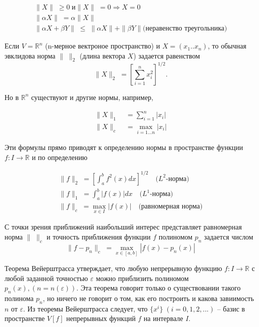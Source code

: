 \begin{equation}
\begin{array}{l}
\parallel X \parallel \; \geq 0 \; \text{и}  \parallel X \parallel \; = 0 \Rightarrow X = 0 \\
\parallel \alpha X \parallel \; = \alpha \parallel X \parallel  \\ 
\parallel \alpha X + \beta Y\parallel \; \leq \; \parallel \alpha  X \parallel + \parallel \beta Y \parallel \text{(неравенство треугольника)}
\end{array}
\end{equation}

Если $V = \mathbb{R}^n$ (n-мерное вектроное пространство) и $X = (x_1 .. x_n)$, то обычная эвклидова норма $\parallel\;\parallel_2$ (длина вектора $X$) задается равенством
\begin{equation}
\parallel X\parallel_2 \; = \left[\sum_{i=1}^{n} x_i^2 \right]^{1/2}.
\end{equation}

Но в $\mathbb{R}^n$ существуют и другие нормы, например,

\begin{align}
\parallel X \parallel_1 \; &= \sum_{i = 1}^{n}|x_i| \\
\parallel X \parallel_c \; &= \max_{i = 1...n}|x_i|
\end{align}

Эти формулы прямо приводят к определению нормы в пространстве функции $f: I \rightarrow \mathbb{R}$ и по определению

\begin{equation}
\begin{gathered}
\parallel f \parallel_2 \; = \left[ \int_{a}^{b} f^2(x)dx \right]^{1/2} \quad \text{($L^2$-норма)}\\
\parallel f \parallel_1 \; = \int_{a}^{b} |f(x)|dx \quad \text{($L^1$-норма)} \\
\parallel f \parallel_c \; = \max_{x \in I}|f(x)| \quad \text{(равномерная норма)}
\end{gathered}
\end{equation} 

С точки зрения приближений наибольший интерес представляет равномерная норма $\parallel \; \parallel_c	$ и точность приближения функции $f$ полиномом $p_n$ задается числом 
\begin{equation}
\parallel f - p_n \parallel_c \; = \max_{x\in [a, b]} |f(x)-p_n(x)|
\end{equation}


Теорема Вейерштрасса утверждает, что любую непрерывную функцию $f: I \rightarrow \mathbb{R}$  с любой заданной точностью $\varepsilon$ можно приблизить полиномом $p_n(x), (n = n(\varepsilon))$. 
Эта теорема говорит только о существовании такого полинома $p_n$, но ничего не говорит о том, как его построить и какова завиимость $n$ от $\varepsilon$. 
Из теоремы Вейерштрасса следует, что $\{x^i\} \; (i = 0, 1, 2, ...)$ -- базис в пространстве $V[f]$ непрерывных функций $f$ на интервале $I$.


